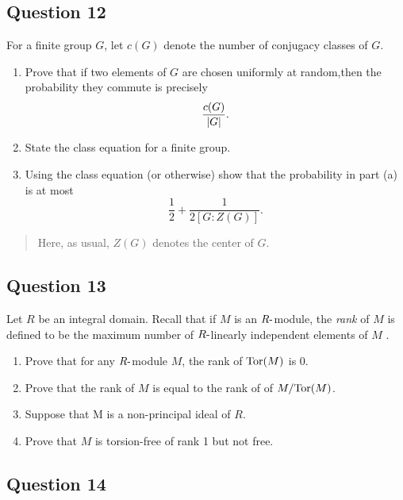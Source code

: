 \documentclass[12pt]{article}
\begin{document}
\hypertarget{question-12}{%
\subsection{Question 12}\label{question-12}}

For a finite group \(G\), let \(c(G)\) denote the number of conjugacy
classes of \(G\).

\begin{enumerate}
\def\labelenumi{(\alph{enumi})}
\item
  Prove that if two elements of \(G\) are chosen uniformly at
  random,then the probability they commute is precisely \[
  \frac{c(G)}{{\left\lvert {G} \right\rvert}}
  .\]
\item
  State the class equation for a finite group.
\item
  Using the class equation (or otherwise) show that the probability in
  part (a) is at most \[
  \frac 1 2 + \frac 1 {2[G : Z(G)]}
  .\]
\end{enumerate}

\begin{quote}
Here, as usual, \(Z(G)\) denotes the center of \(G\).
\end{quote}

\hypertarget{question-13}{%
\subsection{Question 13}\label{question-13}}

Let \(R\) be an integral domain. Recall that if \(M\) is an
\(R{\hbox{-}}\)module, the \emph{rank} of \(M\) is defined to be the maximum
number of \(R{\hbox{-}}\)linearly independent elements of \(M\) .

\begin{enumerate}
\def\labelenumi{(\alph{enumi})}
\item
  Prove that for any \(R{\hbox{-}}\)module \(M\), the rank of \(\text{Tor}(M )\) is
  0.
\item
  Prove that the rank of \(M\) is equal to the rank of of
  \(M/\text{Tor}(M )\).
\item
  Suppose that M is a non-principal ideal of \(R\).
\item
  Prove that \(M\) is torsion-free of rank 1 but not free.
\end{enumerate}

\hypertarget{question-14}{%
\subsection{Question 14}\label{question-14}}
\end{document}
